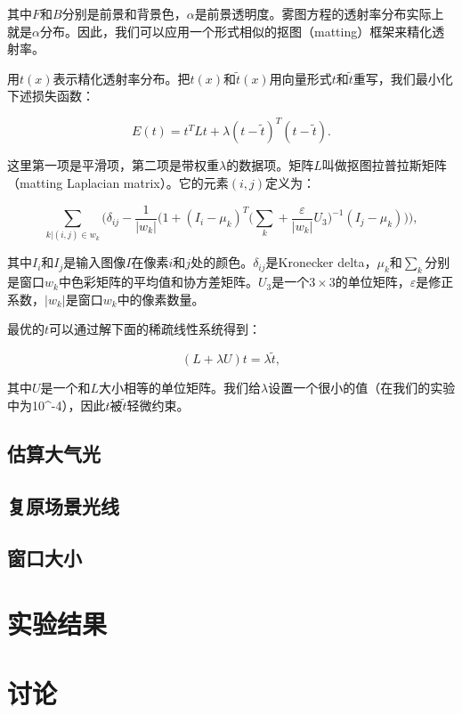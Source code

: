 \documentclass{ctexart}
\begin{document}
其中$F$和$B$分别是前景和背景色，$\alpha$是前景透明度。雾图方程的透射率分布实际上就是$\alpha$分布。因此，我们可以应用一个形式相似的抠图（matting）\cite{LevinLischinskiWeiss2006}框架来精化透射率。\par

用$t(x)$表示精化透射率分布。把$t(x)$和$\tilde{t}(x)$用向量形式$t$和$\tilde{t}$重写，我们最小化下述损失函数：

\begin{equation}\label{equ:15}
	E(t) = t^TLt + \lambda(t-\tilde{t})^T(t-\tilde{t}).
\end{equation}

这里第一项是平滑项，第二项是带权重$\lambda$的数据项。矩阵$L$叫做抠图拉普拉斯矩阵（matting Laplacian matrix）\cite{LevinLischinskiWeiss2006}。它的元素$(i, j)$定义为：

\begin{equation}\label{equ:16}
	\sum_{k | (i, j) \in w_k}\Big(
	\delta_{ij} - \frac{1}{|w_k|} \Big(
	1 + (I_i - \mu_k)^T \big(\sum_k + \frac{\varepsilon}{|w_k|}U_3\big)^{-1} (I_j - \mu_k)
	\Big)
	\Big),
\end{equation}

其中$I_i$和$I_j$是输入图像$I$在像素$i$和$j$处的颜色。$\delta_{ij}$是Kronecker delta，$\mu_k$和$\sum_k$分别是窗口$w_k$中色彩矩阵的平均值和协方差矩阵。$U_3$是一个$3 \times 3$的单位矩阵，$\varepsilon$是修正系数，$|w_k|$是窗口$w_k$中的像素数量。\par

最优的$t$可以通过解下面的稀疏线性系统得到：

\begin{equation}\label{equ:17}
	(L + \lambda U)t = \lambda \tilde{t},
\end{equation}

其中$U$是一个和$L$大小相等的单位矩阵。我们给$\lambda$设置一个很小的值（在我们的实验中为10^{-4}），因此$t$被$\tilde{t}$轻微约束。\par





\subsection{估算大气光}\label{sec:4.3}

\subsection{复原场景光线}

\subsection{窗口大小}


\section{实验结果}

\section{讨论}




\end{document}
